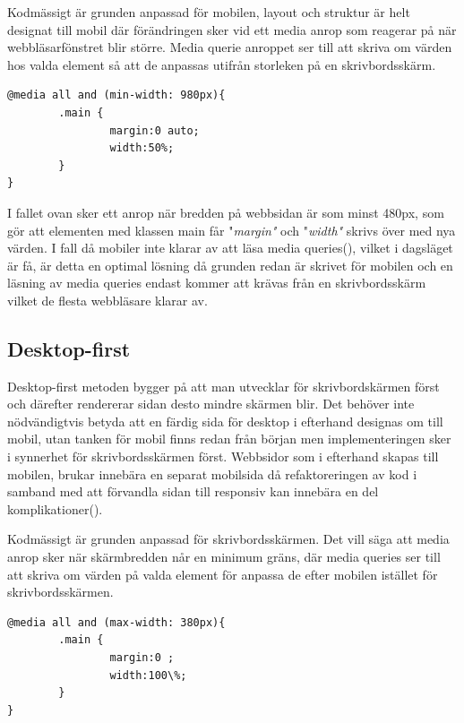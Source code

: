 \documentclass[11pt]{article}
\begin{document}
Kodmässigt är grunden anpassad för mobilen, layout och struktur är helt designat till mobil där förändringen sker vid ett media anrop som reagerar på när webbläsarfönstret blir större. Media querie anroppet ser till att skriva om värden hos valda element så att de anpassas utifrån storleken på en skrivbordsskärm.
 
\vspace{0.5cm}
 \begin{verbatim}
@media all and (min-width: 980px){
        .main {
                margin:0 auto;
                width:50%;
        }
}
\end{verbatim}

\vspace{0.5cm}
I fallet ovan sker ett anrop när bredden på webbsidan är som minst 480px, som gör att elementen med klassen main får "\textit{margin"} och "\textit{width"} skrivs över med nya värden. I fall då mobiler inte klarar av att läsa media queries(\cite{adaptiveresp}), vilket i dagsläget är få, är detta en optimal lösning då grunden redan är skrivet för mobilen och en läsning av media queries endast kommer att krävas från en skrivbordsskärm vilket de flesta webbläsare klarar av.

\subsection{Desktop-first}
Desktop-first metoden bygger på att man utvecklar för skrivbordskärmen först och därefter rendererar sidan desto mindre skärmen blir. Det behöver inte nödvändigtvis betyda att en färdig sida för desktop i efterhand designas om till mobil, utan tanken för mobil finns redan från början men implementeringen sker i synnerhet för skrivbordsskärmen först. Webbsidor som i efterhand skapas till mobilen, brukar innebära en separat mobilsida då refaktoreringen av kod i samband med att förvandla sidan till responsiv kan innebära en del komplikationer(\cite{adaptiveresp}).  

Kodmässigt är grunden anpassad för skrivbordsskärmen. Det vill säga att media anrop sker när skärmbredden når en minimum gräns, där media queries ser till att skriva om värden på valda element för anpassa de efter mobilen istället för skrivbordsskärmen.


\vspace{0.5cm}
 \begin{verbatim}
@media all and (max-width: 380px){
        .main {
                margin:0 ;
                width:100\%;
        }
}
\end{verbatim}
\vspace{0.5cm}
\end{document}
